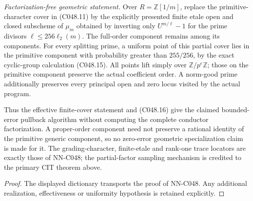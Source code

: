 \begin{geometricstatement}[NN-C048]
\emph{Factorization-free geometric statement.} Over $R=\mathbb Z[1/m]$, replace the primitive-character cover
in (C048.11) by the explicitly presented finite etale open and
closed subscheme of $\mu_m$ obtained by inverting only
$U^{m/\ell}-1$ for the prime divisors $\ell\le256\ell_2(m)$.
The full-order component remains among its components. For
every splitting prime, a uniform point of this partial cover
lies in the primitive component with probability greater than
$255/256$, by the exact cyclic-group calculation (C048.15).
All points lift simply over $\mathbb Z/p^e\mathbb Z$; those
on the primitive component preserve the actual coefficient
order. A norm-good prime additionally preserves every principal
open and zero locus visited by the actual program.

Thus the effective finite-cover statement and (C048.16) give
the claimed bounded-error pullback algorithm without computing
the complete conductor factorization. A proper-order component
need not preserve a rational identity of the primitive generic
component, so no zero-error geometric specialization claim is
made for it. The grading-character, finite-etale and rank-one
trace locators are exactly those of NN-C048; the partial-factor
sampling mechanism is credited to the primary CIT theorem above.
\end{geometricstatement}
\begin{proof} The displayed dictionary transports the proof of NN-C048. Any additional realization, effectiveness or uniformity hypothesis is retained explicitly.\end{proof}


